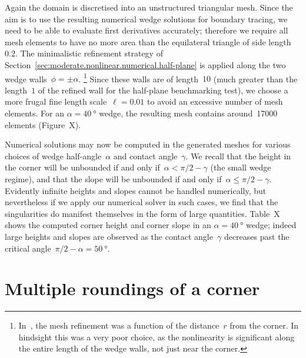 Again the domain is discretised into an unstructured triangular mesh.
Since the aim is to use the resulting numerical wedge solutions
for boundary tracing,
we need to be able to evaluate first derivatives accurately;
therefore we require all mesh elements to have no more area than
the equilateral triangle of side length~$0.2$.
The minimalistic refinement strategy
of Section~\ref{sec:moderate.nonlinear.numerical.half-plane}
is applied along the two wedge walls~$\phi = \pm \alpha$.%
\footnote{
  In~\cite{li-2017-thesis-rounding-capillary-wedge},
  the mesh refinement was a function of the distance~$r$ from the corner.
  In hindsight this was a very poor choice,
  as the nonlinearity is significant
  along the entire length of the wedge walls,
  not just near the corner.
}
Since these walls are of length~$10$
(much greater than the length~$1$
of the refined wall for the half-plane benchmarking test),
we choose a more frugal fine length scale~$\ell = 0.01$
to avoid an excessive number of mesh elements.
For an $\alpha = \SI{40}{\degree}$ wedge,
the resulting mesh contains around~17000 elements
(Figure~X).

Numerical solutions may now be computed in the generated meshes
for various choices of wedge half-angle~$\alpha$ and contact angle~$\gamma$.
We recall that the height in the corner will be unbounded
if and only if~$\alpha < \pi/2 - \gamma$ (the small wedge regime),
and that the slope will be unbounded
if and only if~$\alpha \le \pi/2 - \gamma$.
Evidently infinite heights and slopes cannot be handled numerically,
but nevertheless if we apply our numerical solver in such cases,
we find that the singularities do manifest themselves
in the form of large quantities.
Table~X %
shows the computed corner height and corner slope
in an $\alpha = \SI{40}{\degree}$ wedge;
indeed large heights and slopes are observed
as the contact angle~$\gamma$
decreases past the critical angle~$\pi/2 - \alpha = \SI{50}{\degree}$.

\section{Multiple roundings of a corner}
\label{sec:moderate.multiple}
